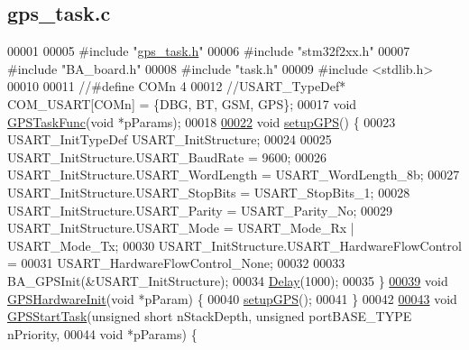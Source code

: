 \hypertarget{gps__task_8c_source}{\subsection{gps\+\_\+task.\+c}
\label{gps__task_8c_source}
}

\begin{DoxyCode}
00001 
00005 \textcolor{preprocessor}{#include "\hyperlink{gps__task_8h}{gps\_task.h}"}
00006 \textcolor{preprocessor}{#include "stm32f2xx.h"}
00007 \textcolor{preprocessor}{#include "BA\_board.h"}
00008 \textcolor{preprocessor}{#include "task.h"}
00009 \textcolor{preprocessor}{#include <stdlib.h>}
00010 
00011 \textcolor{comment}{//#define COMn 4}
00012 \textcolor{comment}{//USART\_TypeDef* COM\_USART[COMn] = \{DBG, BT, GSM, GPS\};}
00017 \textcolor{comment}{}\textcolor{keywordtype}{void} \hyperlink{gps__task_8c_abdcfae3302239b75ae41f8d99d7ef7d4}{GPSTaskFunc}(\textcolor{keywordtype}{void} *pParams);
00018 
\hypertarget{gps__task_8c_source_l00022}{}\hyperlink{gps__task_8c_a6ff22959c4c93001c06b23ec016df388}{00022} \textcolor{keywordtype}{void} \hyperlink{gps__task_8c_a6ff22959c4c93001c06b23ec016df388}{setupGPS}() \{
00023   USART\_InitTypeDef USART\_InitStructure;
00024 
00025   USART\_InitStructure.USART\_BaudRate = 9600;
00026   USART\_InitStructure.USART\_WordLength = USART\_WordLength\_8b;
00027   USART\_InitStructure.USART\_StopBits = USART\_StopBits\_1;
00028   USART\_InitStructure.USART\_Parity = USART\_Parity\_No;
00029   USART\_InitStructure.USART\_Mode = USART\_Mode\_Rx | USART\_Mode\_Tx;
00030   USART\_InitStructure.USART\_HardwareFlowControl =
00031   USART\_HardwareFlowControl\_None;
00032 
00033   BA\_GPSInit(&USART\_InitStructure);
00034   \hyperlink{main_8c_a7d5d5262a3c7d9c39a226ed465e347dc}{Delay}(1000);
00035 \}
\hypertarget{gps__task_8c_source_l00039}{}\hyperlink{gps__task_8h_ab5a1e3a14590de2541497dd0c38c15a8}{00039} \textcolor{keywordtype}{void} \hyperlink{gps__task_8c_ab5a1e3a14590de2541497dd0c38c15a8}{GPSHardwareInit}(\textcolor{keywordtype}{void} *pParam) \{
00040   \hyperlink{gps__task_8c_a6ff22959c4c93001c06b23ec016df388}{setupGPS}();
00041 \}
00042 
\hypertarget{gps__task_8c_source_l00043}{}\hyperlink{gps__task_8h_ac8c08e783e9eabb617e98e4af988aeed}{00043} \textcolor{keywordtype}{void} \hyperlink{gps__task_8c_ac8c08e783e9eabb617e98e4af988aeed}{GPSStartTask}(\textcolor{keywordtype}{unsigned} \textcolor{keywordtype}{short} nStackDepth, \textcolor{keywordtype}{unsigned} portBASE\_TYPE nPriority,
00044     \textcolor{keywordtype}{void} *pParams) \{

\end{DoxyCode}

